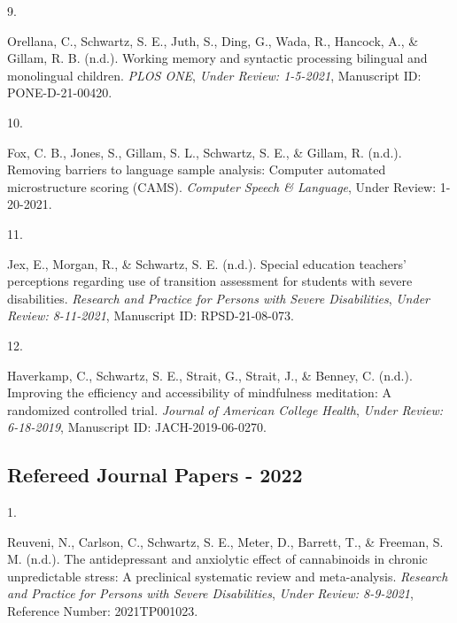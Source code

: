 \documentclass[11pt,a4paper,]{moderncv}
\newlength{\csllabelwidth}
\newcommand{\CSLLeftMargin}[1]{\parbox[t]{\csllabelwidth}{#1}}
\newcommand{\CSLRightInline}[1]{\parbox[t]{\linewidth - \csllabelwidth}{#1}}
\begin{document}
\leavevmode{}%
\CSLLeftMargin{9. }
\CSLRightInline{Orellana, C., Schwartz, S. E., Juth, S., Ding, G., Wada,
R., Hancock, A., \& Gillam, R. B. (n.d.). Working memory and syntactic
processing bilingual and monolingual children. \emph{PLOS ONE},
\emph{Under Review: 1-5-2021}, Manuscript ID: PONE-D-21-00420.}

\leavevmode{}%
\CSLLeftMargin{10. }
\CSLRightInline{Fox, C. B., Jones, S., Gillam, S. L., Schwartz, S. E.,
\& Gillam, R. (n.d.). Removing barriers to language sample analysis:
Computer automated microstructure scoring (CAMS). \emph{Computer Speech
\& Language}, Under Review: 1-20-2021.}

\leavevmode{}%
\CSLLeftMargin{11. }
\CSLRightInline{Jex, E., Morgan, R., \& Schwartz, S. E. (n.d.). Special
education teachers' perceptions regarding use of transition assessment
for students with severe disabilities. \emph{Research and Practice for
Persons with Severe Disabilities}, \emph{Under Review: 8-11-2021},
Manuscript ID: RPSD-21-08-073.}

\leavevmode{}%
\CSLLeftMargin{12. }
\CSLRightInline{Haverkamp, C., Schwartz, S. E., Strait, G., Strait, J.,
\& Benney, C. (n.d.). Improving the efficiency and accessibility of
mindfulness meditation: A randomized controlled trial. \emph{Journal of
American College Health}, \emph{Under Review: 6-18-2019}, Manuscript ID:
JACH-2019-06-0270.}

\vspace{7mm}

\hypertarget{refereed-journal-papers---2022}{%
\subsection{\texorpdfstring{\textbf{Refereed Journal Papers -
2022}}{Refereed Journal Papers - 2022}}\label{refereed-journal-papers---2022}}

\hypertarget{refs_journals2022}{}
\leavevmode{}%
\CSLLeftMargin{1. }
\CSLRightInline{Reuveni, N., Carlson, C., Schwartz, S. E., Meter, D.,
Barrett, T., \& Freeman, S. M. (n.d.). The antidepressant and anxiolytic
effect of cannabinoids in chronic unpredictable stress: A preclinical
systematic review and meta-analysis. \emph{Research and Practice for
Persons with Severe Disabilities}, \emph{Under Review: 8-9-2021},
Reference Number: 2021TP001023.}
\end{document}
